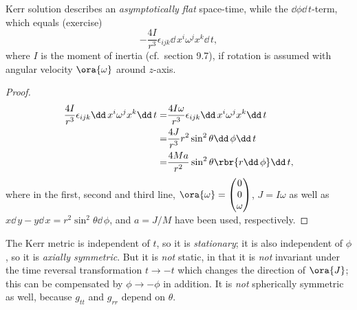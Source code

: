 \begin{nameddef}{Kerr solution}
 describes an \emph{asymptotically flat} space-time,
while the $\dd\phi\dd\, t$-term, which equals (exercise)
\begin{equation*}
-\frac{4I}{r^3}\epsilon_{ijk}\dd\, x^i\omega^j x^k\dd\, t,
\end{equation*}
where $I$ is the moment of inertia (cf.\ section 9.7), if rotation is assumed
with angular velocity $\ora{\omega}$ around $z$-axis.
\begin{proof}
\begin{align}
\frac{4I}{r^3} \epsilon_{ijk}\dd\, x^i\omega^j x^k\dd\, t
=& \frac{4I\omega}{r^3} \epsilon_{ijk}\dd\, x^i\omega^j x^k\dd\, t \nonumber \\
=& \frac{4J}{r^3} r^2\sin^2\theta\dd\,\phi\dd\, t \nonumber \\
=& \frac{4Ma}{r^2} \sin^2\theta\rbr{r\dd\,\phi}\dd\, t,
\end{align}
where in the first, second and third line, $\ora{\omega} =
\begin{pmatrix} 0 \\ 0 \\ \omega\end{pmatrix}$, $J = I\omega$ as well as
$x\dd\, y - y\dd\, x = r^2\sin^2\theta\dd\,\phi$, and $a = J/M$ have been
used, respectively.
\end{proof}

The Kerr metric is independent of $t$, so it is \emph{stationary}; it is also
independent of $\phi$, so it is \emph{axially symmetric}. But it is \emph{not}
static, in that it is \emph{not} invariant under the time reversal
transformation $t\to -t$ which changes the direction of $\ora{J}$; this can be
compensated by $\phi \to -\phi$ in addition. It is \emph{not} spherically
symmetric as well, because $g_{tt}$ and $g_{rr}$ depend on $\theta$.
\end{nameddef} %

